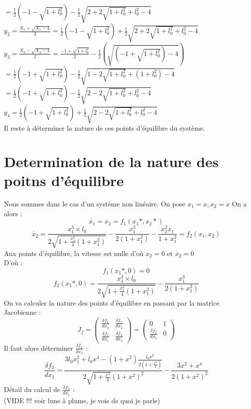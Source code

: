 \documentclass[10pt,a4paper]{article}
\begin{document}
$=\frac{1}{2}(-1-\sqrt{1+l_0^2})-\frac{1}{2}\sqrt{2+2\sqrt{1+l_0^2}+l_0^2-4}$\\
$y_2=\frac{X_1+\sqrt{X_1-4}}{2}=\frac{1}{2}(-1-\sqrt{1+l_0^2})+\frac{1}{2}\sqrt{2+2\sqrt{1+l_0^2}+l_0^2-4}$\\
$y_3=\frac{X_2-\sqrt{X_2-4}}{2}=\frac{-1+\sqrt{1+l_0^2}}{2}-\frac{1}{2}(\sqrt{(-1+\sqrt{1+l_0^2})-4})$\\
$=\frac{1}{2}(-1+\sqrt{1+l_0^2})-\frac{1}{2}\sqrt{1-2\sqrt{1+l_0^2}+(1+l_0^2)-4}$\\
$=\frac{1}{2}(-1+\sqrt{1+l_0^2})-\frac{1}{2}\sqrt{2-2\sqrt{1+l_0^2}+l_0^2-4}$\\
$y_4=\frac{1}{2}(-1+\sqrt{1+l_0^2})+\frac{1}{2}\sqrt{2-2\sqrt{1+l_0^2}+l_0^2-4}$\\
Il reste à déterminer la nature de ces points d'équilibre du système.

\section{Determination de la nature des poitns d'équilibre}
Nous sommes dans le cas d'un système non linéaire. 
On pose $x_1=x, x_2=\dot{x}$
On a alors :
\[\dot{x_1}=x_2=f_1(x_1*,x_2*)\]
\[\dot{x_2}=\frac{x_1^3\times l_0}{2\sqrt{1+\frac{x_1^4}{4}(1+x_1^2)}}-\frac{x_1^3}{2(1+x_1^2)}-\frac{x_2^2x_1}{1+x_1^2}=f_2(x_1,x_2)\]
Aux points d'équilibre, la vitesse est nulle d'où $x_2=0$ et $\dot{x_2}=0$\\
D'où :\\
\[ f_1(x_1*,0) = 0 \]
\[ f_2(x_1*,0) = \frac{x_1^3\times l_0}{2\sqrt{1+\frac{x_1^4}{4}(1+x_1^2)}}-\frac{x_1^3}{2(1+x_1^2)} \]
On va calculer la nature des points d'équilibre en passant par la matrice Jacobienne :\\
\[
J_f=
\begin{pmatrix}
\frac{\delta f_1}{dx_1} & \frac{\delta f_1}{dx_2} \\
\frac{\delta f_2}{dx_1} & \frac{\delta f_2}{dx_2}
\end{pmatrix}
=
\begin{pmatrix}
0&1\\
\frac{\delta f_2}{dx_1}&0
\end{pmatrix}
\]
Il faut alors déterminer $\frac{\delta f_2}{dx_1}$ : \\
\[ \frac{\delta f_2}{dx_1} = \frac{3l_0x_1^2+l_0x^4 - (1+x^2)\frac{l_0x^6}{2(1+\frac{x^4}{4})}}{2\sqrt{1+\frac{x^4}{4}}(1+x^2)^2}-\frac{3x^2+x^4}{2(1+x^2)^2} \]
Détail du calcul de  $\frac{\delta f_2}{dx_1}$ :\\
(VIDE !!! voir lune à plume, je vois de quoi je parle)\\
\end{document}
